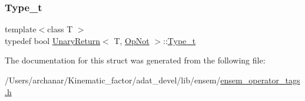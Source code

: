 \subsubsection{\texorpdfstring{Type\_t}{Type\_t}\hspace{0.1cm}{\footnotesize\ttfamily [2/2]}}
{\footnotesize\ttfamily template$<$class T $>$ \\
typedef bool \mbox{\hyperlink{structUnaryReturn}{Unary\+Return}}$<$ T, \mbox{\hyperlink{structOpNot}{Op\+Not}} $>$\+::\mbox{\hyperlink{structUnaryReturn_3_01T_00_01OpNot_01_4_a3c2ea34de12d5f13e356568135a80bd9}{Type\+\_\+t}}}



The documentation for this struct was generated from the following file\+:\begin{DoxyCompactItemize}
\item 
/\+Users/archanar/\+Kinematic\+\_\+factor/adat\+\_\+devel/lib/ensem/\mbox{\hyperlink{lib_2ensem_2ensem__operator__tags_8h}{ensem\+\_\+operator\+\_\+tags.\+h}}\end{DoxyCompactItemize}
